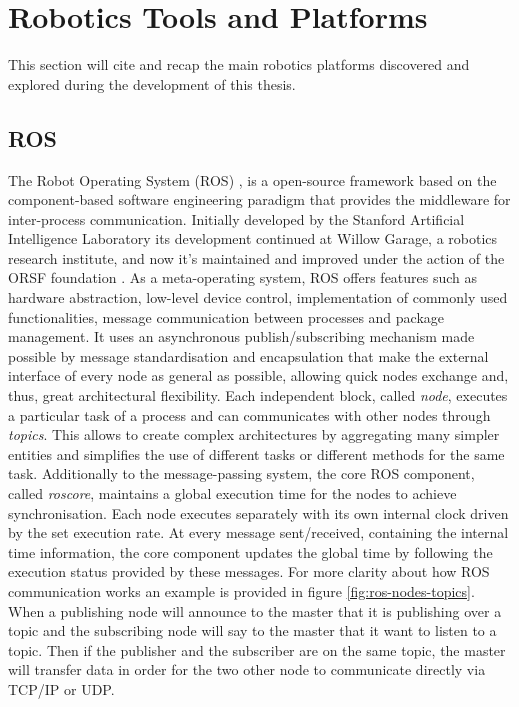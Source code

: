 \section{Robotics Tools and Platforms} \label{sec:Robotics-Tools-and-Platforms}
This section will cite and recap the main robotics platforms discovered and explored during the development of this thesis.

\subsection{ROS}
The Robot Operating System (ROS) \cite{ROS}, is a open-source framework based on the component-based software engineering paradigm that provides the middleware for inter-process communication. Initially developed by the Stanford  Artificial Intelligence Laboratory its development continued at Willow Garage, a robotics research institute, and now it's maintained and improved under the action of the ORSF foundation \cite{ROS}. As a meta-operating system, ROS offers features such as hardware abstraction, low-level device control, implementation of commonly used functionalities, message communication between processes and package management. It uses an asynchronous publish/subscribing mechanism made possible by message standardisation and encapsulation that make the external interface of every node as general as possible, allowing quick nodes exchange and, thus, great architectural flexibility. Each independent block, called \textit{node}, executes a particular task of a process and can communicates with other nodes through \textit{topics}. This allows to create complex architectures by aggregating many simpler entities and simplifies the use of different tasks  or different methods for the same task. Additionally to the message-passing system, the core ROS component, called \textit{roscore}, maintains a global execution time for the nodes to achieve synchronisation. Each node executes separately with its own internal clock driven by the set execution rate. At every message sent/received, containing the internal time information, the core component updates the global time by following the execution status provided by these messages.
For more clarity about how ROS communication works an example is provided in figure \ref{fig:ros-nodes-topics}. When a publishing node will announce to the master that it is publishing over a topic and the subscribing node will say to the master that it want to listen to a topic. Then if the publisher
and the subscriber are on the same topic, the master will transfer data in order for the two other node to communicate directly via TCP/IP or UDP.

